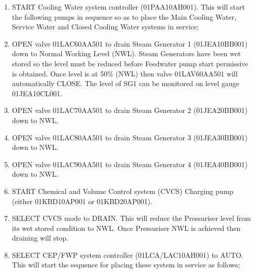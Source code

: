 \documentclass[10pt,a4paper]{article}
\begin{document}
\begin{enumerate}
\item START Cooling Water system controller (01PAA10AH001). This will start the following pumps in sequence so as to place the Main Cooling Water, Service Water and Closed Cooling Water systems in service;
\item OPEN valve 01LAC60AA501 to drain Steam Generator 1 (01JEA10BB001) down to Normal Working Level (NWL). Steam Generators have been wet stored so the level must be reduced before Feedwater pump start permissive is obtained. Once level is at 50\% (NWL) then valve 01LAV60AA501 will automatically CLOSE. The level of SG1 can be monitored on level gauge 01JEA10CL001.
\item OPEN valve 01LAC70AA501 to drain Steam Generator 2 (01JEA20BB001) down to NWL.
\item OPEN valve 01LAC80AA501 to drain Steam Generator 3 (01JEA30BB001) down to NWL.
\item OPEN valve 01LAC90AA501 to drain Steam Generator 4 (01JEA40BB001) down to NWL.
\item START Chemical and Volume Control system (CVCS) Charging pump (either 01KBD10AP001 or 01KBD20AP001).
\item SELECT CVCS mode to DRAIN. This will reduce the Pressuriser level from its wet stored condition to NWL. Once Pressuriser NWL is achieved then draining will stop.
\item SELECT CEP/FWP system controller (01LCA/LAC10AH001) to AUTO. This will start the sequence for placing these system in service as follows;
\end{enumerate}
\end{document}
